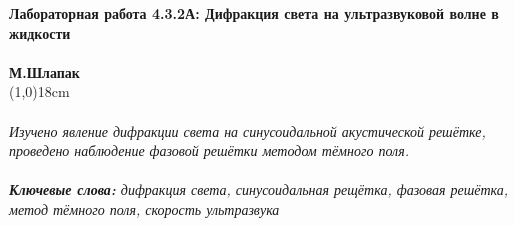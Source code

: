 \documentclass[a4paper]{article}
\begin{document}
 
\large
\noindent \textbf{Лабораторная работа 4.3.2А: Дифракция света на ультразвуковой волне в жидкости}\\
\\
\normalsize
\textbf{М.Шлапак}\\
\line(1,0){18cm}\\
\\
\footnotesize
\textit{Изучено явление дифракции света на синусоидальной акустической решётке, проведено наблюдение фазовой решётки методом тёмного поля.}\\
\\
\textit{\textbf{Ключевые слова:} дифракция света, синусоидальная рещётка, фазовая решётка, метод тёмного поля, скорость ультразвука}\\
\end{document}
